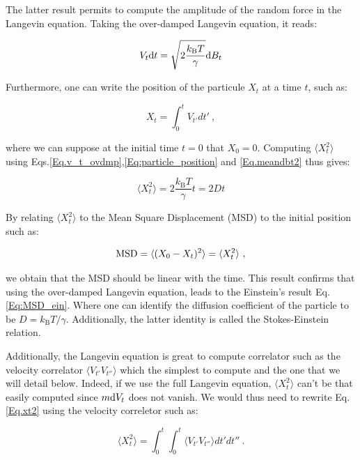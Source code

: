 The latter result permits to compute the amplitude of the random force in the Langevin equation. Taking the over-damped Langevin equation, it reads:

\begin{equation}
	V_t\textnormal{d}t  = \sqrt{2\frac{k_\mathrm{B}T}{\gamma}} \textnormal{d}B_t 
	\label{Eq.v_t_ovdmp}
\end{equation}

Furthermore, one can write the position of the particule $X_t$ at a time $t$, such as:

\begin{equation}
	X_t = \int _0 ^t V_{t'}dt'~,
	\label{Eq:particle_position}
\end{equation}

where we can suppose at the initial time $t=0$ that $X_0 = 0$. Computing 
$\langle X_t^2 \rangle$ using Eqs.\ref{Eq.v_t_ovdmp},\ref{Eq:particle_position} and \ref{Eq.meandbt2} thus gives:

\begin{equation}
	\langle X_t ^2 \rangle =  2\frac{k_\mathrm{B}T}{\gamma}t = 2Dt
	\label{Eq.xt2}
\end{equation}

By relating $\langle X_t ^2 \rangle$ to the Mean Square Displacement (\gls{MSD}) to the initial position such as:

\begin{equation}
	\textnormal{MSD} = \langle (X_0 - X_ t)^2 \rangle = 	\langle X_t ^2 \rangle~,
\end{equation}


we obtain that the \gls{MSD} should be linear with the time. This result confirms that using the over-damped Langevin equation, leads to the Einstein's result Eq.\ref{Eq:MSD_ein}. Where one can identify the diffusion coefficient of the particle to be $D = k_\mathrm{B}T / \gamma$. Additionally, the latter identity is called the Stokes-Einstein  relation.


Additionally, the Langevin equation is great to compute correlator such as the velocity correlator $ \langle V_{t'}V_{t''} \rangle$ which the simplest to compute and the one that we will detail below. Indeed, if we use the full Langevin equation, $\langle X_t ^2 \rangle$ can't be that easily computed since $m\textnormal{d} V_t$ does not vanish. We would thus need to rewrite Eq.\ref{Eq.xt2}  using the velocity correletor such as:

\begin{equation}
	\langle X_t ^ 2 \rangle  = \int _0 ^ {t} \int _0 ^{t} \langle V_{t'}V_{t''} \rangle dt'dt'' ~.
	\label{Eq.int_msd}
\end{equation}

